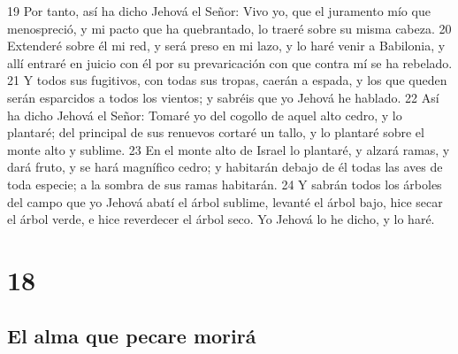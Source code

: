 19 Por tanto, así ha dicho Jehová el Señor: Vivo yo, que el juramento mío que menospreció, y mi pacto que ha quebrantado, lo traeré sobre su misma cabeza.
20 Extenderé sobre él mi red, y será preso en mi lazo, y lo haré venir a Babilonia, y allí entraré en juicio con él por su prevaricación con que contra mí se ha rebelado.
21 Y todos sus fugitivos, con todas sus tropas, caerán a espada, y los que queden serán esparcidos a todos los vientos; y sabréis que yo Jehová he hablado.
22 Así ha dicho Jehová el Señor: Tomaré yo del cogollo de aquel alto cedro, y lo plantaré; del principal de sus renuevos cortaré un tallo, y lo plantaré sobre el monte alto y sublime.
23 En el monte alto de Israel lo plantaré, y alzará ramas, y dará fruto, y se hará magnífico cedro; y habitarán debajo de él todas las aves de toda especie; a la sombra de sus ramas habitarán.
24 Y sabrán todos los árboles del campo que yo Jehová abatí el árbol sublime, levanté el árbol bajo, hice secar el árbol verde, e hice reverdecer el árbol seco. Yo Jehová lo he dicho, y lo haré.

\chapter{18}

\section*{El alma que pecare morirá}

